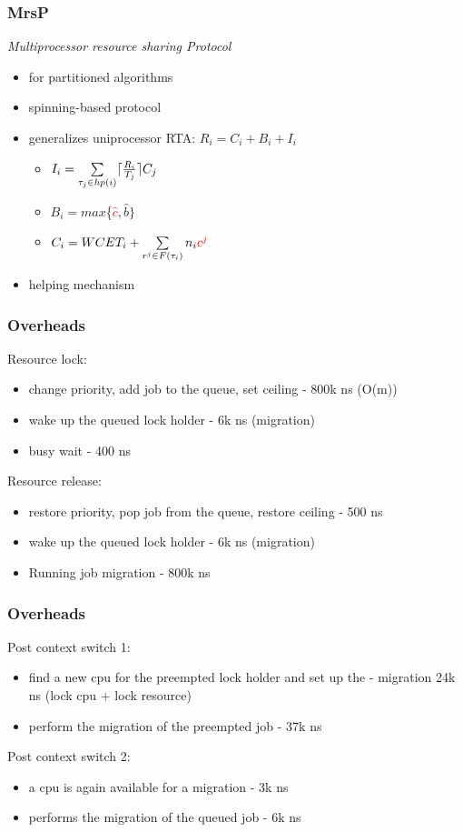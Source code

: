 \documentclass{beamer}
\DeclarePairedDelimiter\ceil{\lceil}{\rceil}
\begin{document}
\begin{frame}
\frametitle{MrsP}
\emph{Multiprocessor resource sharing Protocol}
\begin{itemize}
\item for partitioned algorithms
\item spinning-based protocol
\item generalizes uniprocessor RTA: $R_i = C_i + B_i + I_i$
  \begin{itemize}
    \item $I_i = \sum\limits_{\tau_j \in hp(i)} \ceil{\frac{R_i}{T_j}} C_j$
    \item $B_i = max$\{\textcolor{red}{$\hat{c}$}$,\hat{b}\}$
    \item $C_i = WCET_i + \sum\limits_{r^j \in F(\tau_i)} n_i \textcolor{red}{c^j}$
  \end{itemize} 
\item helping mechanism
\end{itemize}
\end{frame}

\begin{frame}
  \frametitle{Overheads}

  Resource lock:\\
  \begin{itemize}
    \item change priority, add job to the queue, set ceiling - 800k ns (O(m))
    \item wake up the queued lock holder - 6k ns (migration)
    \item busy wait - 400 ns
  \end{itemize}

  Resource release:
  \begin{itemize}
    \item restore priority, pop job from the queue, restore ceiling - 500 ns
    \item wake up the queued lock holder - 6k ns (migration)
    \item Running job migration - 800k ns
  \end{itemize}

\end{frame}

\begin{frame}
  \frametitle{Overheads}

  Post context switch 1:
  \begin{itemize}
    \item find a new cpu for the preempted lock holder and set up the - migration 24k ns (lock cpu + lock resource)
    \item perform the migration of the preempted job - 37k ns
  \end{itemize}

  Post context switch 2:
  \begin{itemize}
    \item a cpu is again available for a migration - 3k ns
    \item performs the migration of the queued job - 6k ns
  \end{itemize}  

\end{frame}
\end{document}
